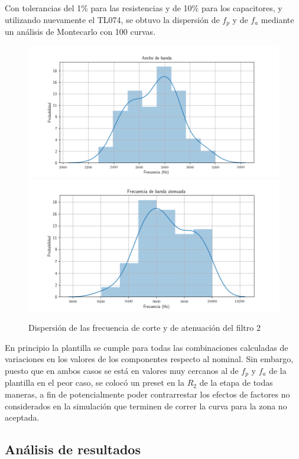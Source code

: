 \documentclass[../../tc_tp5_main.tex]{subfiles}
\begin{document}
Con tolerancias del 1\% para las resistencias y de 10\% para los capacitores, y utilizando nuevamente el TL074, se obtuvo la dispersi\'on de $f_p$ y de $f_a$ mediante un an\'alisis de Montecarlo con 100 curvas. 

\begin{figure}[H]
	\centering
	\includegraphics[scale=0.7]{imagenes/bes_hist_bw.png}
	\includegraphics[scale=0.7]{imagenes/bes_hist_fa.png}
	\caption{Dispersi\'on de las frecuencia de corte y de atenuaci\'on del filtro 2}
\end{figure}

En principio la plantilla se cumple para todas las combinaciones calculadas de variaciones en los valores de los componentes respecto al nominal. Sin embargo, puesto que en ambos casos se est\'a en valores muy cercanos al de $f_p$ y $f_a$ de la plantilla en el peor caso, se coloc\'o un preset en la $R_2$ de la etapa de todas maneras, a fin de potencialmente poder contrarrestar los efectos de factores no considerados en la simulaci\'on que terminen de correr la curva para la zona no aceptada. \par


\subsection{An\'alisis de resultados}
\end{document}
